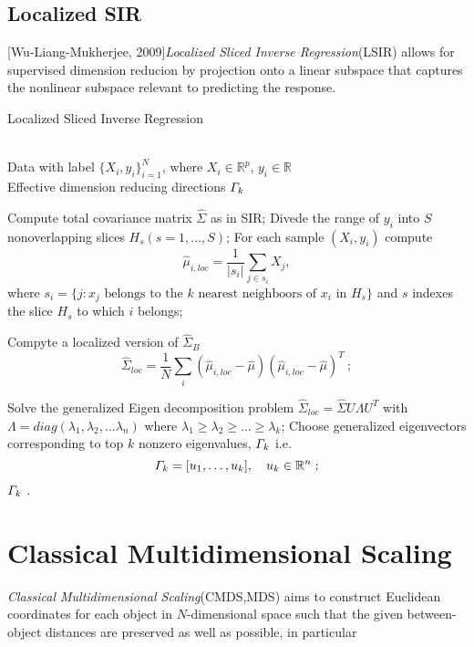 \documentclass[twoside]{article}
\theoremstyle{definition}
\theoremstyle{definition}
\theoremstyle{remark}
\def\R{{\mathbb R}}
\begin{document}
\subsection{Localized SIR}
[Wu-Liang-Mukherjee, 2009]\emph{Localized Sliced Inverse Regression}(LSIR) allows for supervised dimension reducion by projection onto a linear subspace that captures the nonlinear subspace relevant to predicting the response.

\begin{algorithm}[htb]   
\caption{Localized Sliced Inverse Regression}   
\label{alg:lsir}   
\begin{algorithmic}[1] %
\REQUIRE ~~\\ %
 Data with label $\{X_i,y_i\}_{i=1}^N$, where $X_i\in \mathbb{R}^p$, $y_i\in \mathbb{R}$
\ENSURE ~~\\ %
Effective dimension reducing directions $\mathnormal{\Gamma}_k$

\STATE Compute total covariance matrix $\hat{\Sigma}$ as in SIR; 
\STATE Divede the range of $y_i$ into $S$ nonoverlapping slices $H_s(s = 1,...,S)$;
\STATE For each sample $(X_i,y_i)$ compute 
 $$ \hat{\mu}_{i,loc} = \frac{1}{|s_i|} \sum\limits_{j\in s_i } X_j ,$$
 where $s_i = \{j: x_j \text{ belongs to the $k$ nearest neighboors of $x_i$ in $H_s$}\}$ and $s$ indexes the slice $H_s$ to which $i$ belongs;

\STATE Compyte a localized version of $\hat{\Sigma}_B$ 
$$ \hat{\Sigma}_{loc}  = \frac{1}{N} \sum\limits_{i} (\hat{\mu}_{i,loc} - \hat{\mu})(\hat{\mu}_{i,loc} - \hat{\mu})^T \ ;$$
 
\STATE Solve the generalized Eigen decomposition problem 
$\hat{\Sigma}_{loc} = \hat{\Sigma} U\Lambda U^T $ with $\Lambda = diag(\lambda_1,\lambda_2,...\lambda_n)$ where  $\lambda_1 \ge \lambda_2 \ge ... \ge \lambda_k$;
\STATE Choose generalized eigenvectors corresponding to top $k$ nonzero eigenvalues, $\mathnormal{\Gamma}_k$ i.e.
$$\mathnormal{\Gamma}_k=[u_1,\ldots,u_k], \ \ \ u_k\in \R^n \;;$$ 
\RETURN $\mathnormal{\Gamma_k}$ . %
\end{algorithmic}
\end{algorithm}
\section{Classical Multidimensional Scaling}
  \emph{Classical Multidimensional Scaling}(CMDS,MDS) aims to construct Euclidean coordinates for each object in $N$-dimensional space such that the given between-object distances are preserved as well as possible, in particular 
\end{document}
